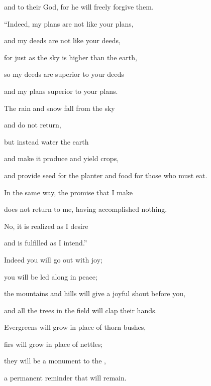 {\par }{\Q and to their God,
for
he will freely
forgive them.
\par }{\Q {}“Indeed,
my plans are not
like your plans,
\par }{\Q and my deeds are not
like your deeds,
\par }{\Q {}for
just as
the sky
is higher than
the earth,
\par }{\Q so
my deeds are superior
to your deeds
\par }{\Q and my plans superior
to your plans.
\par }{\Q The rain
and snow
fall from
the sky
\par }{\Q and do not
return,
\par }{\Q but
instead water
the
earth
\par }{\Q and make it produce
and yield
crops,
\par }{\Q and provide
seed
for
the planter
and food
for those who must eat.
\par }{\Q {}In the same way,
the promise
that
I make
\par }{\Q does not
return
to
me, having accomplished
nothing.
\par }{\Q No,
it is realized as
I desire
\par }{\Q and is fulfilled
as
I intend.”
\par }{\Q {}Indeed
you will go out
with joy;
\par }{\Q you will be led
along in peace;
\par }{\Q the mountains
and hills
will give
a joyful shout
before
you,
\par }{\Q and all
the trees
in the field
will clap
their hands.
\par }{\Q {}Evergreens
will grow
in place of
thorn bushes,
\par }{\Q firs
will grow
in place of
nettles;
\par }{\Q they will be
a monument
to the
{},

\par }{\Q a permanent
reminder
that will remain.

}
